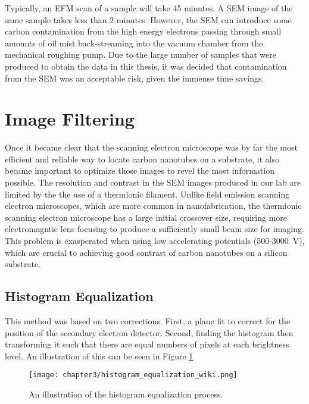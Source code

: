 Typically, an EFM scan of a sample will take 45 minutes. A SEM image of the same sample takes less than 2 minutes. However, the SEM can introduce some carbon contamination from the high energy electrons passing through small amounts of oil mist back-streaming into the vacuum chamber from the mechanical roughing pump. Due to the large number of samples that were produced to obtain the data in this thesis, it was decided that contamination from the SEM was an acceptable risk, given the immense time savings.

\section{Image Filtering}

Once it became clear that the scanning electron microscope was by far the most efficient and reliable way to locate carbon nanotubes on a substrate, it also became important to optimize those images to revel the most information possible. The resolution and contrast in the SEM images produced in our lab are limited by the the use of a thermionic  filament. Unlike field emission scanning electron microscopes, which are more common in nanofabrication, the thermionic scanning electron microscope has a large initial crossover size, requiring more electromagntic lens focusing to produce a sufficiently small beam size for imaging. This problem is exasperated when using low accelerating potentials (500-\SI{3000}{\volt}), which are crucial to achieving good contrast of carbon nanotubes on a silicon substrate.

\subsection{Histogram Equalization}

This method was based on two corrections. First, a plane fit to correct for the position of the secondary electron detector. Second, finding the histogram then transforming it such that there are equal numbers of pixels at each brightness level. An illustration of this can be seen in Figure \ref{fig:hist_eq}

\begin{figure}
	\centering
	\texttt{[image: chapter3/histogram\_equalization\_wiki.png]}
	\caption{An illustration of the histogram equalization process.}
	\label{fig:hist_eq}
\end{figure}

